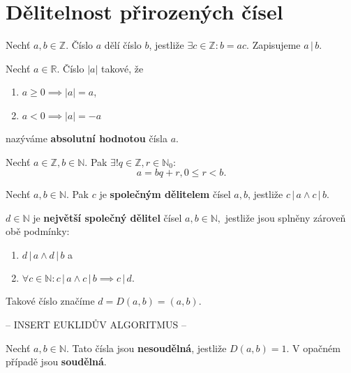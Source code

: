 \section{Dělitelnost přirozených čísel}
\begin{definition}
  Nechť $a,b\in\mathbb Z.$ Číslo $a$ dělí číslo $b$, jestliže $\exists c \in \mathbb Z: b=ac$. Zapisujeme $a\, | \, b$.
\end{definition}

\begin{definition}
  Nechť $a\in \mathbb R$. Číslo $|a|$ takové, že
  \begin{enumerate}[$i.$]
    \item $a\geq 0 \implies |a| = a$,
    \item $a<0 \implies |a| = - a$
  \end{enumerate}
  nazýváme \textbf{absolutní hodnotou} čísla $a$.
\end{definition}

\begin{veta}
  Nechť $a\in \mathbb Z, b\in \mathbb N.$ Pak $\exists ! q \in \mathbb Z, r\in \mathbb N_0:$
  $$a=bq+r, 0 \leq r < b.$$
\end{veta}

\begin{definition}
  Nechť $a,b\in \mathbb N$. Pak $c$ je \textbf{společným dělitelem} čísel $a,b$, jestliže $c \, | \, a \land c\, | \, b.$
\end{definition}

\begin{definition}
  $d\in \mathbb N$ je \textbf{největší společný dělitel} čísel $a,b \in \mathbb N,$ jestliže jsou splněny zároveň obě podmínky:
  \begin{enumerate}[$i.$]
    \item $d\, | \, a \land d \, | \, b$ a
    \item $\forall c \in \mathbb N: c \, | \, a \land c \, | \, b \implies c \, | \, d.$
  \end{enumerate}
  Takové číslo značíme $d=D(a,b)=(a,b).$
\end{definition}

\begin{definition}
  -- INSERT EUKLIDŮV ALGORITMUS --
\end{definition}

\begin{definition}
  Nechť $a,b\in \mathbb N.$ Tato čísla jsou \textbf{nesoudělná}, jestliže $D(a,b)=1$. V opačném případě jsou \textbf{soudělná}.
\end{definition}

